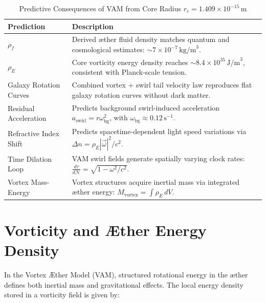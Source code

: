 \documentclass[12pt]{article}
\begin{document}
    \begin{table}[H]
        \footnotesize
        \centering
        \renewcommand{\arraystretch}{1.2}
        \begin{tabular}{|l|p{10.5cm}|}
            \hline
            \textbf{Prediction} & \textbf{Description} \\
            \hline
            \(\rho_{\!f}\) & Derived æther fluid density matches quantum and cosmological estimates: \( \sim 7 \times 10^{-7} \, \text{kg/m}^3 \). \\
            \hline
            \(\rho_{\scriptscriptstyle\boldsymbol\!E}\) & Core vorticity energy density reaches \( \sim 8.4 \times 10^{35} \, \text{J/m}^3 \), consistent with Planck-scale tension. \\
            \hline
            Galaxy Rotation Curves & Combined vortex + swirl tail velocity law reproduces flat galaxy rotation curves without dark matter. \\
            \hline
            Residual Acceleration & Predicts background swirl-induced acceleration \( a_{\text{swirl}} = r \omega_{\text{bg}}^2 \), with \( \omega_{\text{bg}} \approx 0.12 \, \text{s}^{-1} \). \\
            \hline
            Refractive Index Shift & Predicts spacetime-dependent light speed variations via \( \Delta n = \rho_{\scriptscriptstyle\boldsymbol\!E} |\vec{\omega}|^2 / c^2 \). \\
            \hline
            Time Dilation Loop & VAM swirl fields generate spatially varying clock rates: \( \frac{d\tau}{d\mathcal{N}} = \sqrt{1 - \omega^2/c^2} \). \\
            \hline
            Vortex Mass-Energy & Vortex structures acquire inertial mass via integrated æther energy: \( M_{\text{vortex}} = \int \rho_{\scriptscriptstyle\boldsymbol\!E} \, dV \). \\
            \hline
        \end{tabular}
        \caption{Predictive Consequences of VAM from Core Radius \( r_c = 1.409 \times 10^{-15} \, \text{m} \)}
        \label{tab:vam_predictions}
    \end{table}


    \section{Vorticity and Æther Energy Density}

    In the Vortex \AE{}ther Model (VAM), structured rotational energy in the æther defines both inertial mass and gravitational effects. The local energy density stored in a vorticity field is given by:
\end{document}
